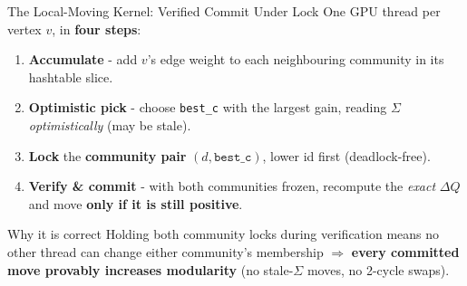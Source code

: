 \documentclass[aspectratio=169]{beamer}
\begin{document}
\begin{frame}{The Local-Moving Kernel: Verified Commit Under Lock}
    One GPU thread per vertex $v$, in \textbf{four steps}:
    \begin{enumerate}\small
        \item \textbf{Accumulate} - add $v$'s edge weight to each neighbouring community in
        its hashtable slice.
        \item \textbf{Optimistic pick} - choose \texttt{best\_c} with the largest gain,
        reading $\Sigma$ \emph{optimistically} (may be stale).
        \item \textbf{Lock} the \textbf{community pair} $(d,\texttt{best\_c})$, lower id first
        (deadlock-free).
        \item \textbf{Verify \& commit} - with both communities frozen, recompute the
        \emph{exact} $\Delta Q$ and move \textbf{only if it is still positive}.
    \end{enumerate}
    \vspace{0.3em}
    \begin{exampleblock}{Why it is correct}
    Holding both community locks during verification means no other thread can change either
    community's membership $\Rightarrow$ \textbf{every committed move provably increases
    modularity} (no stale-$\Sigma$ moves, no 2-cycle swaps).
    \end{exampleblock}
\end{frame}
\end{document}
